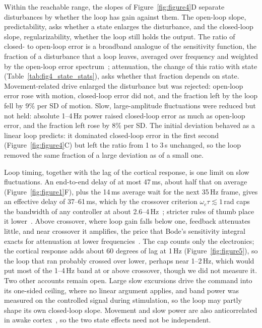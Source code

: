 Within the reachable range, the slopes of Figure~\ref{fig:figure4}D separate disturbances by whether the loop has gain against them. The open-loop slope, predictability, asks whether a state enlarges the disturbance, and the closed-loop slope, regularizability, whether the loop still holds the output. The ratio of closed- to open-loop error is a broadband analogue of the sensitivity function, the fraction of a disturbance that a loop leaves, averaged over frequency and weighted by the open-loop error spectrum~\citep{astrom2008feedback}; attenuation, the change of this ratio with state (Table~\ref{tab:fig4_state_stats}), asks whether that fraction depends on state. Movement-related drive enlarged the disturbance but was rejected: open-loop error rose with motion, closed-loop error did not, and the fraction left by the loop fell by 9\% per SD of motion. Slow, large-amplitude fluctuations were reduced but not held: absolute 1--4\,Hz power raised closed-loop error as much as open-loop error, and the fraction left rose by 8\% per SD. The initial deviation behaved as a linear loop predicts: it dominated closed-loop error in the first second (Figure~\ref{fig:figure4}C) but left the ratio from 1 to 3\,s unchanged, so the loop removed the same fraction of a large deviation as of a small one.

Loop timing, together with the lag of the cortical response, is one limit on slow fluctuations. An end-to-end delay of at most 47\,ms, about half that on average (Figure~\ref{fig:figure1}F), plus the 14\,ms average wait for the next 35\,Hz frame, gives an effective delay of 37--61\,ms, which by the crossover criterion $\omega_c \tau \lesssim 1$\,rad caps the bandwidth of any controller at about 2.6--4\,Hz~\citep{skogestad2005multivariable}; stricter rules of thumb place it lower~\citep{astrom2000limitations}. Above crossover, where loop gain falls below one, feedback attenuates little, and near crossover it amplifies, the price that Bode's sensitivity integral exacts for attenuation at lower frequencies~\citep{astrom2008feedback}. The cap counts only the electronics; the cortical response adds about 60 degrees of lag at 1\,Hz (Figure~\ref{fig:figure5}), so the loop that ran probably crossed over lower, perhaps near 1--2\,Hz, which would put most of the 1--4\,Hz band at or above crossover, though we did not measure it. Two other accounts remain open. Large slow excursions drive the command into its one-sided ceiling, where no linear argument applies, and band power was measured on the controlled signal during stimulation, so the loop may partly shape its own closed-loop slope. Movement and slow power are also anticorrelated in awake cortex~\citep{McGinley2015waking}, so the two state effects need not be independent.

